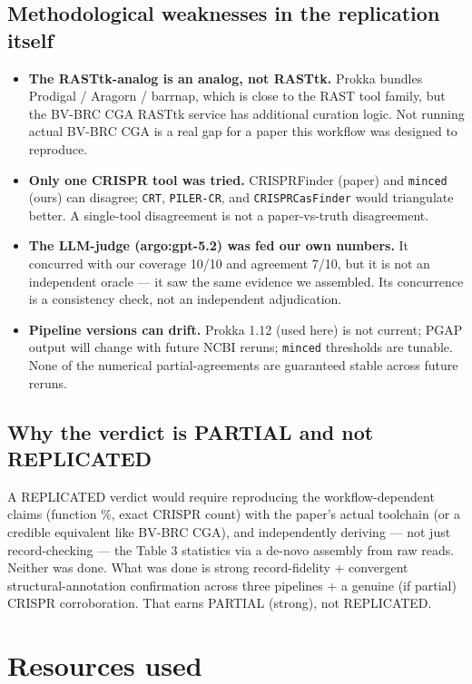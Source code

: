 \documentclass[11pt]{article}
\begin{document}
\subsection{Methodological weaknesses in the replication itself}
\begin{itemize}[leftmargin=*, itemsep=2pt]
  \item \textbf{The RASTtk-analog is an analog, not RASTtk.} Prokka bundles Prodigal / Aragorn /
  barrnap, which is close to the RAST tool family, but the BV-BRC CGA RASTtk service has
  additional curation logic. Not running actual BV-BRC CGA is a real gap for a paper this workflow
  was designed to reproduce.
  \item \textbf{Only one CRISPR tool was tried.} CRISPRFinder (paper) and \texttt{minced} (ours)
  can disagree; \texttt{CRT}, \texttt{PILER-CR}, and \texttt{CRISPRCasFinder} would triangulate
  better. A single-tool disagreement is not a paper-vs-truth disagreement.
  \item \textbf{The LLM-judge (argo:gpt-5.2) was fed our own numbers.} It concurred with our
  coverage 10/10 and agreement 7/10, but it is not an independent oracle --- it saw the same
  evidence we assembled. Its concurrence is a consistency check, not an independent adjudication.
  \item \textbf{Pipeline versions can drift.} Prokka 1.12 (used here) is not current; PGAP output
  will change with future NCBI reruns; \texttt{minced} thresholds are tunable. None of the
  numerical partial-agreements are guaranteed stable across future reruns.
\end{itemize}

\subsection{Why the verdict is PARTIAL and not REPLICATED}

A REPLICATED verdict would require reproducing the workflow-dependent claims (function \%, exact
CRISPR count) with the paper's actual toolchain (or a credible equivalent like BV-BRC CGA), and
independently deriving --- not just record-checking --- the Table 3 statistics via a de-novo
assembly from raw reads. Neither was done. What was done is strong record-fidelity + convergent
structural-annotation confirmation across three pipelines + a genuine (if partial) CRISPR
corroboration. That earns PARTIAL (strong), not REPLICATED.

\section{Resources used}
\end{document}
